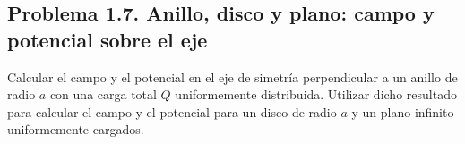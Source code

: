\subsection{Problema 1.7. Anillo, disco y plano: campo y potencial sobre el eje}\label{sem:anillo}
\begin{ejercicio}\label{ejer:anillo}
Calcular el campo y el potencial en el eje de simetría perpendicular a un anillo de radio $a$ con una carga total $Q$ uniformemente distribuida. Utilizar dicho resultado para calcular el campo y el potencial para un disco de radio $a$
y un plano infinito uniformemente cargados.
\end{ejercicio}

